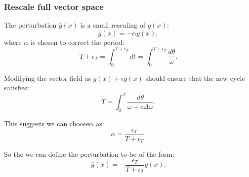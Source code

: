\documentclass{article}
\newcommand{\boa}{\operatorname{BoA}}
\newcounter{ct}
\begin{document}

%
%
%

\subsubsection{Rescale full vector space}\label{sec:rescale_period}
The perturbation \( \bar{g}(x) \) is a small rescaling of \( g(x) \):
\[
\bar{g}(x) = -\alpha g(x),
\]
where \( \alpha \) is chosen to correct the period:
\[
T + \epsilon_T = \int_0^{T+\epsilon_T} dt = \int_0^{T+\epsilon_T} \frac{d\theta}{\omega}.
\]

Modifying the vector field as \( g(x) + \epsilon \bar{g}(x) \) should ensure that the new cycle satisfies:
\[
T = \int_0^T \frac{d\theta}{\omega + \epsilon \Delta \omega}.
\]

This suggests we can  choose\( \alpha \) as:
\[
\alpha = \frac{\epsilon_T}{T + \epsilon_T}.
\]

So the we can define the perturbation to be of the form:
\[
\bar{g}(x) = -\frac{\epsilon_T}{T + \epsilon_T} g(x).
\]
\end{document}
